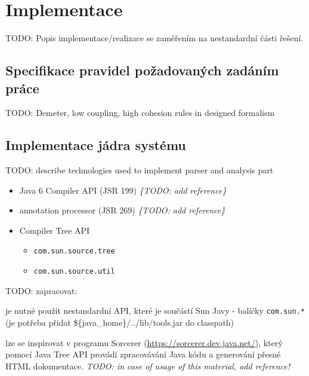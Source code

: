 \chapter{Implementace}

TODO: Popis implementace/realizace se zaměřením na nestandardní části řešení.

\section{Specifikace pravidel požadovaných zadáním práce}

TODO: Demeter, low coupling, high cohesion rules in designed formalism

\section{Implementace jádra systému}
TODO: describe technologies used to implement parser and analysis part
\begin{itemize}
\item Java 6 Compiler API (JSR 199) \emph{\{TODO: add reference\}}
\item annotation processor (JSR 269) \emph{\{TODO: add reference\}}
\item Compiler Tree API
  \begin{itemize}
  \item \verb+com.sun.source.tree+ 
  \item \verb+com.sun.source.util+
  \end{itemize}
\end{itemize}

TODO: zapracovat:

je nutné použít nestandardní API, které je součástí Sun Javy - balíčky \verb+com.sun.*+ (je potřeba přidat \$\{java\_home\}/../lib/tools.jar do classpath)

lze se inspirovat v programu Sorcerer (\href{https://sorcerer.dev.java.net/}{https://sorcerer.dev.java.net/}), který pomocí Java Tree API provádí zpracovávání Java kódu a generování přesné HTML dokumentace. \emph{TODO: in case of usage of this material, add reference!}
